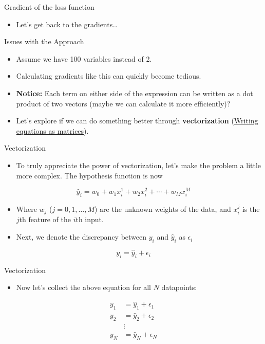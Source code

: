 \begin{frame}{Gradient of the loss function}
\begin{itemize}
    \item Let’s get back to the gradients\ldots
\end{itemize}
\end{frame}


\begin{frame}{Issues with the Approach}
\begin{itemize}
    \item Assume we have 100 variables instead of 2.
    \item Calculating gradients like this can quickly become tedious.
    \item \textbf{Notice:} Each term on either side of the expression can be written as a dot product of two vectors (maybe we can calculate it more efficiently)?
\end{itemize}

\vspace{1em}

\begin{itemize}
    \item Let’s explore if we can do something better through \textbf{vectorization} (\underline{Writing equations as matrices}).
\end{itemize}
\end{frame}

\begin{frame}{Vectorization}
\begin{itemize}
    \item To truly appreciate the power of vectorization, let’s make the problem a little more complex. The hypothesis function is now
\end{itemize}

\[
\hat{y}_i = w_0 + w_1 x_i^1 + w_2 x_i^2 + \cdots + w_M x_i^M
\]

\begin{itemize}
    \item Where $w_j$ ($j = 0, 1, \ldots, M$) are the unknown weights of the data, and $x_i^j$ is the $j$th feature of the $i$th input.
    \item Next, we denote the discrepancy between $y_i$ and $\hat{y}_i$ as $\epsilon_i$
\end{itemize}

\[
y_i = \hat{y}_i + \epsilon_i
\]
\end{frame}

\begin{frame}{Vectorization}
\begin{itemize}
    \item Now let’s collect the above equation for all $N$ datapoints:
\end{itemize}

\[
\begin{aligned}
    y_1 &= \hat{y}_1 + \epsilon_1 \\
    y_2 &= \hat{y}_2 + \epsilon_2 \\
        &\vdots \\
    y_N &= \hat{y}_N + \epsilon_N
\end{aligned}
\]
\end{frame}

